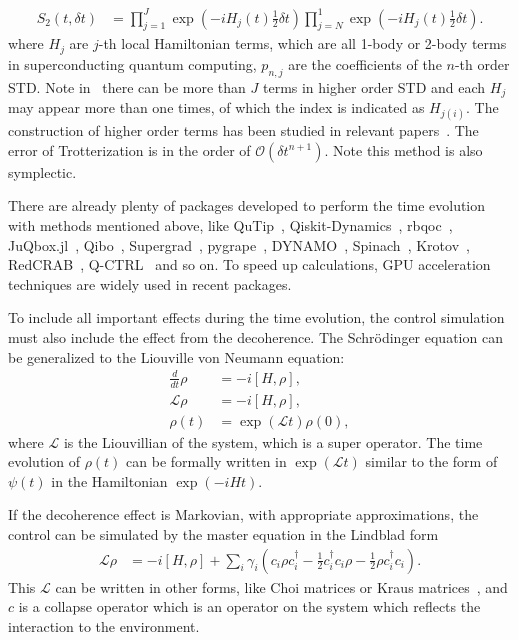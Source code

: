 \documentclass[a4paper,onecolumn,11pt,unpublished]{quantumarticle}
\begin{document}
\begin{enumerate}
\begin{align}
          S_2(t, \delta t) & = \prod_{j=1}^J \exp(-i H_j(t)\frac{1}{2}\delta t)\prod_{j=N}^1 \exp(-i H_j(t)\frac{1}{2}\delta t). \label{eq:trotter_2}
        \end{align}
        where $H_j$ are $j$-th local Hamiltonian terms, which are all 1-body or 2-body terms in superconducting quantum computing, $p_{n,j}$ are the coefficients of the $n$-th order STD. Note in~ there can be more than $J$ terms in higher order STD and each $H_j$ may appear more than one times, of which the index is indicated as $H_{j(i)}$. The construction of higher order terms has been studied in relevant papers~\cite{Yoshida1990Construction,Morales2022Greatly,Ostmeyer2023Optimised}. The error of Trotterization is in the order of $\mathcal{O}(\delta t^{n+1})$.  Note this method is also symplectic.
\end{enumerate}

There are already plenty of packages developed to perform the time evolution with methods mentioned above, like QuTip~\cite{Johansson2013QuTiP,Johansson2012QuTiP,Lambert2024QuTiP}, Qiskit-Dynamics~\cite{Puzzuoli2023Algorithms}, rbqoc~\cite{Propson2022Robust}, JuQbox.jl~\cite{Petersson2022Optimal,Petersson2020Discrete}, Qibo~\cite{Efthymiou2021Qibo}, Supergrad~\cite{Wang2025SuperGrad}, pygrape~\cite{Reinhold2019Controlling}, DYNAMO~\cite{Machnes2011Comparing}, Spinach~\cite{Hogben2011textitSpinach}, Krotov~\cite{Goerz2019Krotov}, RedCRAB~\cite{Heck2018Remote,Zoller2018Optimal}, Q-CTRL~\cite{Ball2021Software} and so on. To speed up calculations, GPU acceleration techniques are widely used in recent packages.

To include all important effects during the time evolution, the control simulation must also include the effect from the decoherence. The Schr\"odinger equation can be generalized to the Liouville von Neumann equation:
\begin{align}
  \frac{d}{dt}\rho & = -i[H, \rho], \label{eq:liouville_von_neumann}        \\
  \mathcal{L}\rho  & = -i[H,\rho], \label{eq:liouvillian}                   \\
  \rho(t)          & = \exp(\mathcal{L} t) \rho(0), \label{eq:rho_time_evo}
\end{align}
where $\mathcal{L}$ is the Liouvillian of the system, which is a super operator. The time evolution of $\rho(t)$ can be formally written in $\exp(\mathcal{L}t)$ similar to the form of $\psi(t)$ in the Hamiltonian $\exp(-iHt)$.

If the decoherence effect is Markovian, with appropriate approximations, the control can be simulated by the master equation in the Lindblad form
\begin{align}
  \mathcal{L}\rho & = -i[H,\rho] + \sum_i \gamma_i(c_i\rho c_i^{\dagger} - \frac{1}{2}c_i^{\dagger}c_i\rho - \frac{1}{2}\rho c_i^{\dagger}c_i). \label{eq:lindblad}
\end{align}
This $\mathcal{L}$ can be written in other forms, like Choi matrices or Kraus matrices~\cite{Nielsen2010Quantum}, and $c$ is a collapse operator which is an operator on the system which reflects the interaction to the environment.
\end{document}
